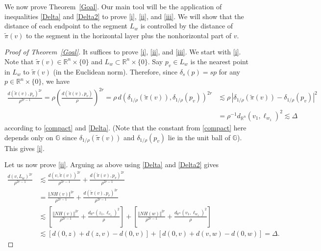 \documentclass[11pt]{amsart}
\theoremstyle{definition}
\numberwithin{theorem}{section} \numberwithin{equation}{section}
\begin{document}
We now prove Theorem~\ref{Goal}.
Our main tool will be the application of inequalities \eqref{Delta} and \eqref{Delta2}
to prove \eqref{i}, \eqref{ii}, and \eqref{iii}.
We will show that the distance of each endpoint to the segment $L_w$
is controlled by the
distance of $\tilde{\pi}(v)$ to the segment in the horizontal layer
plus the nonhorizontal part of $v$.
\begin{proof}[Proof of Theorem~\ref{Goal}]
It suffices to prove \eqref{i}, \eqref{ii}, and \eqref{iii}.
We start with \eqref{i}. 
Note that $\tilde{\pi}(v) \in \mathbb{R}^n \times \{0\}$ and $L_w \subset \mathbb{R}^n \times \{0\}$. 
Say $p_v \in L_w$ is the nearest point in $L_w$ to $\tilde{\pi}(v)$ (in the Euclidean norm).
Therefore, since $\delta_s(p) = sp$ for any $p \in \mathbb{R}^n \times \{ 0 \}$, we have
\begin{align*}
\frac{d(\tilde{\pi}(v),p_v)^{2r} }{\rho^{2r-1}} 
= \rho \left( \frac{d(\tilde{\pi}(v),p_v)}{\rho} \right)^{2r}
= \rho \, d(\delta_{1/\rho} (\tilde{\pi}(v)),\delta_{1/\rho} (p_v))^{2r}
&\lesssim \rho \, |\delta_{1/\rho} (\tilde{\pi}(v)) - \delta_{1/\rho} (p_v)|^{2} \\
&= \rho^{-1} d_{\mathbb{R}^n}(v_1, \ell_{w_1})^{2}
\lesssim \Delta
\end{align*}
according to \eqref{compact} and \eqref{Delta}.
(Note that the constant from \eqref{compact} here depends only on $\mathbb{G}$ 
since $\delta_{1/\rho} (\tilde{\pi}(v))$ and $\delta_{1/\rho} (p_v)$ lie in the unit ball of $\mathbb{G}$).
This gives \eqref{i}. 

Let us now prove \eqref{ii}.
Arguing as above using \eqref{Delta} and \eqref{Delta2} gives
\begin{align*}
\frac{d(v,L_w)^{2r} }{\rho^{2r-1}} 
&\lesssim
\frac{d(v,\tilde{\pi}(v))^{2r} }{\rho^{2r-1}} 
+
\frac{d(\tilde{\pi}(v),p_v)^{2r} }{\rho^{2r-1}} \\
&=
\frac{\Vert NH(v) \Vert^{2r} }{\rho^{2r-1}} 
+
\frac{d(\tilde{\pi}(v),p_v)^{2r} }{\rho^{2r-1}} \\
&\lesssim
\left[ \frac{\Vert NH(v) \Vert^{2r} }{\rho^{2r-1}} 
+
\frac{d_{\mathbb{R}^n}(z_1, \ell_{v_1})^{2}}{\rho} \right]
+
\left[ \frac{\Vert NH(w) \Vert^{2r} }{\rho^{2r-1}} 
+
\frac{d_{\mathbb{R}^n}(v_1, \ell_{w_1})^{2} }{\rho} \right] \\
&\lesssim 
[d(0,z) + d(z,v) - d(0,v)] + [d(0,v) + d(v,w) - d(0,w)] 
= \Delta.
\end{align*}





\end{proof}
\end{document}
